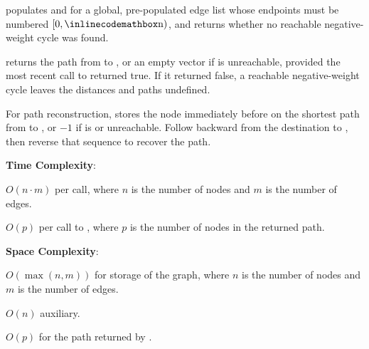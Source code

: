 \begin{compactitem}
  \item {} populates  and  for a global, pre-populated edge list  whose endpoints must be numbered $[0, {\inlinecodemath{n}})$, and returns whether no reachable negative-weight cycle was found.
  \item {} returns the path from  to , or an empty vector if  is unreachable, provided the most recent call to  returned true. If it returned false, a reachable negative-weight cycle leaves the distances and paths undefined.
\end{compactitem}

For path reconstruction,  stores the node immediately before  on the shortest path from  to , or $-1$ if  is  or unreachable. Follow  backward from the destination to , then reverse that sequence to recover the path.

\textbf{Time Complexity}:
\begin{compactitem}
  \item $O(n \cdot m)$ per call, where $n$ is the number of nodes and $m$ is the number of edges.
  \item $O(p)$ per call to , where $p$ is the number of nodes in the returned path.
\end{compactitem}

\textbf{Space Complexity}:
\begin{compactitem}
  \item $O(\max\left(n, m\right))$ for storage of the graph, where $n$ is the number of nodes and $m$ is the number of edges.
  \item $O(n)$ auxiliary.
  \item $O(p)$ for the path returned by .
\end{compactitem}

